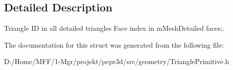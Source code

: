 \subsection{Detailed Description}
Triangle ID in all detailed triangles Face index in m\+Mesh\+Detailed faces;. 

The documentation for this struct was generated from the following file\+:\begin{DoxyCompactItemize}
\item 
D\+:/\+Home/\+M\+F\+F/1-\/\+Mgr/projekt/pepr3d/src/geometry/Triangle\+Primitive.\+h\end{DoxyCompactItemize}
